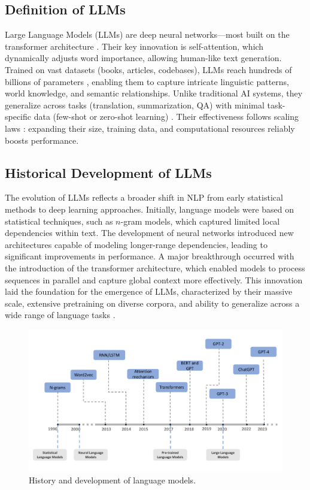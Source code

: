\subsection{Definition of LLMs}
Large Language Models (LLMs) are deep neural networks—most built on the transformer architecture \citep{vaswani2017attention}. Their key innovation is self-attention, which dynamically adjusts word importance, allowing human-like text generation. Trained on vast datasets (books, articles, codebases), LLMs reach hundreds of billions of parameters \citep{brown2020language, touvron2023llama}, enabling them to capture intricate linguistic patterns, world knowledge, and semantic relationships. Unlike traditional AI systems, they generalize across tasks (translation, summarization, QA) with minimal task-specific data (few-shot or zero-shot learning) \citep{brown2020language}. Their effectiveness follows scaling laws \citep{kaplan2020scaling}: expanding their size, training data, and computational resources reliably boosts performance.
\subsection{Historical Development of LLMs}
The evolution of LLMs reflects a broader shift in NLP from early statistical methods to deep learning approaches. Initially, language models were based on statistical techniques, such as $n$-gram models, which captured limited local dependencies within text. The development of neural networks introduced new architectures capable of modeling longer-range dependencies, leading to significant improvements in performance. A major breakthrough occurred with the introduction of the transformer architecture, which enabled models to process sequences in parallel and capture global context more effectively\citep{2402-06853}. This innovation laid the foundation for the emergence of LLMs, characterized by their massive scale, extensive pretraining on diverse corpora, and ability to generalize across a wide range of language tasks .
\begin{figure}[htbp]
	\centering\includegraphics[width=0.7\linewidth]{Figures/historyofllms.png}
	\caption{ History and development of language models.}
	\label{History.png}
\end{figure}


